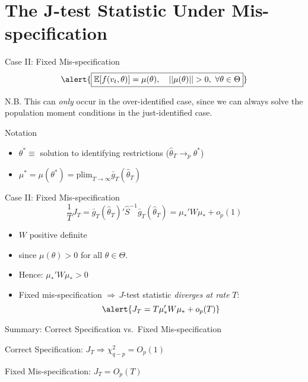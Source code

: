 \section{The J-test Statistic Under Mis-specification}
\begin{frame}{Case II: Fixed Mis-specification} 
  \[
    \alert{\boxed{\mathbb{E}[f(v_t,\theta)] = \mu(\theta), \quad \lvert\lvert \mu(\theta)\rvert\rvert >0,\,\, \forall \theta\in \Theta}}
  \]

  \begin{block}{N.B.}
    This can \emph{only} occur in the over-identified case, since we can always solve the population moment conditions in the just-identified case. 
  \end{block}

  \begin{block}{Notation}
    \vspace{-0.5em}
    \begin{itemize}
      \item $\theta^* \equiv $ solution to identifying restrictions ($\widehat{\theta}_T \rightarrow_p \theta^*$)
      \item $\mu^* = \mu(\theta^*) = \mbox{plim}_{T\rightarrow \infty}\bar{g}_T(\widehat{\theta}_T)$
    \end{itemize}
  \end{block}

\end{frame}
\begin{frame}{Case II: Fixed Mis-specification}
	$$\frac{1}{T} J_T = \bar{g}_T(\widehat{\theta}_T)' \widehat{S}^{-1}\bar{g}_T(\widehat{\theta}_T) = \mu_*' W \mu_* + o_p(1)$$

  \begin{itemize}
    \item $W$ positive definite 
    \item since $\mu(\theta)>0$ for all $\theta\in \Theta$. 
    \item Hence: $\mu_*' W \mu_*>0$ 
    \item Fixed mis-specification $\Rightarrow \, J$-test statistic \emph{diverges at rate} $T$:
      \vspace{-0.5em}
\[
  \alert{J_T = T \mu_*' W \mu_* + o_p(T)}
\]
  \end{itemize}
\end{frame}
\begin{frame}{Summary: Correct Specification vs.\ Fixed Mis-specification}
  
  \begin{alertblock}{Correct Specification: $J_T\Rightarrow \chi^2_{q-p} = O_p(1)$}
  \end{alertblock}

  \begin{alertblock}{Fixed Mis-specification: $J_T = O_p(T)$}
  \end{alertblock}

\end{frame}
